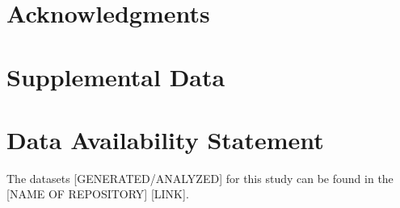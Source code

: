 \documentclass[utf8]{frontiersSCNS} %
\begin{document}
\section*{Acknowledgments}

\section*{Supplemental Data}

\section*{Data Availability Statement}
The datasets [GENERATED/ANALYZED] for this study can be found in the [NAME OF REPOSITORY] [LINK].




\end{document}
